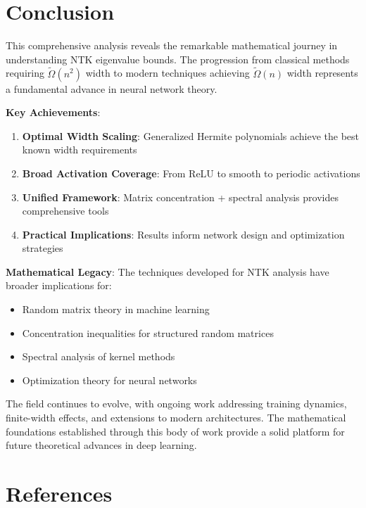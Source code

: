\documentclass{article}
\newcommand{\TildeOmega}{\tilde{\Omega}}
\begin{document}
\section{Conclusion}

This comprehensive analysis reveals the remarkable mathematical journey in understanding NTK eigenvalue bounds. The progression from classical methods requiring $\TildeOmega(n^2)$ width to modern techniques achieving $\TildeOmega(n)$ width represents a fundamental advance in neural network theory.

\textbf{Key Achievements}:
\begin{enumerate}
    \item \textbf{Optimal Width Scaling}: Generalized Hermite polynomials achieve the best known width requirements
    \item \textbf{Broad Activation Coverage}: From ReLU to smooth to periodic activations
    \item \textbf{Unified Framework}: Matrix concentration + spectral analysis provides comprehensive tools
    \item \textbf{Practical Implications}: Results inform network design and optimization strategies
\end{enumerate}

\textbf{Mathematical Legacy}:
The techniques developed for NTK analysis have broader implications for:
\begin{itemize}
    \item Random matrix theory in machine learning
    \item Concentration inequalities for structured random matrices
    \item Spectral analysis of kernel methods
    \item Optimization theory for neural networks
\end{itemize}

The field continues to evolve, with ongoing work addressing training dynamics, finite-width effects, and extensions to modern architectures. The mathematical foundations established through this body of work provide a solid platform for future theoretical advances in deep learning.

\section*{References}
\end{document}
